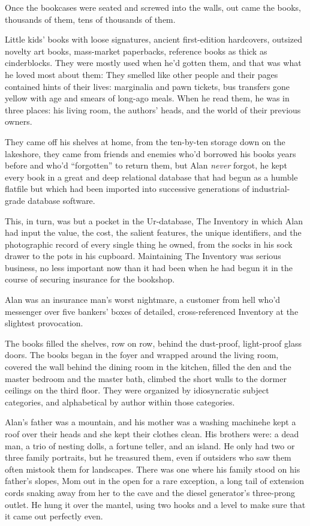 Once the bookcases were seated and screwed into the walls, out came
the books, thousands of them, tens of thousands of them.

Little kids' books with loose signatures, ancient first-edition
hardcovers, outsized novelty art books, mass-market paperbacks,
reference books as thick as cinderblocks.  They were mostly used when
he'd gotten them, and that was what he loved most about them:  They
smelled like other people and their pages contained hints of their
lives:  marginalia and pawn tickets, bus transfers gone yellow with
age and smears of long-ago meals.  When he read them, he was in three
places:  his living room, the authors' heads, and the world of their
previous owners.

They came off his shelves at home, from the ten-by-ten storage down on
the lakeshore, they came from friends and enemies who'd borrowed his
books years before and who'd ``forgotten'' to return them, but Alan
\textit{never} forgot, he kept every book in a great and deep
relational database that had begun as a humble flatfile but which had
been imported into successive generations of industrial-grade database
software.

This, in turn, was but a pocket in the Ur-database, The Inventory in
which Alan had input the value, the cost, the salient features, the
unique identifiers, and the photographic record of every single thing
he owned, from the socks in his sock drawer to the pots in his
cupboard.  Maintaining The Inventory was serious business, no less
important now than it had been when he had begun it in the course of
securing insurance for the bookshop.

Alan was an insurance man's worst nightmare, a customer from hell
who'd messenger over five bankers' boxes of detailed, cross-referenced
Inventory at the slightest provocation.

The books filled the shelves, row on row, behind the dust-proof,
light-proof glass doors.  The books began in the foyer and wrapped
around the living room, covered the wall behind the dining room in the
kitchen, filled the den and the master bedroom and the master bath,
climbed the short walls to the dormer ceilings on the third floor. 
They were organized by idiosyncratic subject categories, and
alphabetical by author within those categories.

Alan's father was a mountain, and his mother was a washing
machine\dash{}he kept a roof over their heads and she kept their clothes
clean.  His brothers were:  a dead man, a trio of nesting dolls, a
fortune teller, and an island.  He only had two or three family
portraits, but he treasured them, even if outsiders who saw them often
mistook them for landscapes.  There was one where his family stood on
his father's slopes, Mom out in the open for a rare exception, a long
tail of extension cords snaking away from her to the cave and the
diesel generator's three-prong outlet.  He hung it over the mantel,
using two hooks and a level to make sure that it came out perfectly
even.

